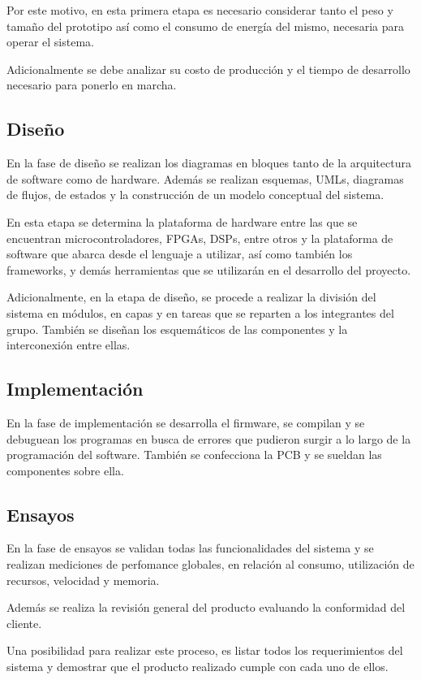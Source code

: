Por este motivo, en esta primera etapa es necesario considerar tanto el peso y tamaño del prototipo así como el consumo de energía del mismo, necesaria para operar el sistema.

Adicionalmente se debe analizar su costo de producción y el tiempo de desarrollo necesario para ponerlo en marcha.


\subsection{Diseño}
En la fase de diseño se realizan los diagramas en bloques tanto de la arquitectura de software como de hardware. Además se realizan esquemas, UMLs, diagramas de flujos, de estados y la construcción de un modelo conceptual del sistema.

En esta etapa se determina la plataforma de hardware entre las que se encuentran microcontroladores, FPGAs, DSPs, entre otros y la plataforma de software que abarca desde el lenguaje a utilizar, así como también los frameworks, y demás herramientas que se utilizarán en el desarrollo del proyecto.

Adicionalmente, en la etapa de diseño, se procede a realizar la división del sistema en módulos, en capas y en tareas que se reparten a los integrantes del grupo. También se diseñan los esquemáticos de las componentes y la interconexión entre ellas.


\subsection{Implementación}

En la fase de implementación se desarrolla el firmware, se compilan y se debuguean los programas en busca de errores que pudieron surgir a lo largo de la programación del software. También se confecciona la PCB y se sueldan las componentes sobre ella.


\subsection{Ensayos}
En la fase de ensayos se validan todas las funcionalidades del sistema y se realizan mediciones de perfomance globales, en relación al consumo, utilización de recursos, velocidad y memoria.

Además se realiza la revisión general del producto evaluando la conformidad del cliente.

Una posibilidad para realizar este proceso, es listar todos los requerimientos del sistema y demostrar que el producto realizado cumple con cada uno de ellos.



